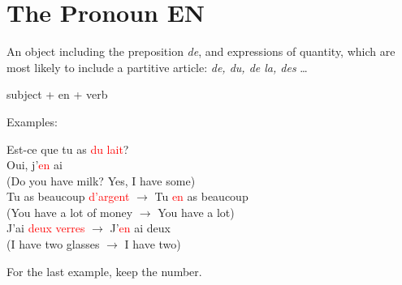 \documentclass{book}
\begin{document}
    \section{The Pronoun EN}
        An object including the preposition \textit{de}, and expressions of quantity, which are most likely to include a partitive article: \textit{de, du, de la, des} \dots
        \begin{center}
            subject + en + verb
        \end{center}
        Examples:
        \begin{center}
            Est-ce que tu as \textcolor{red}{du lait}? \\
            Oui, j'\textcolor{red}{en} ai \\
            (Do you have milk? Yes, I have some) \\
            Tu as beaucoup \textcolor{red}{d'argent} $\to$ Tu \textcolor{red}{en} as beaucoup \\
            (You have a lot of money $\to$ You have a lot) \\
            J'ai \textcolor{red}{deux verres} $\to$ J'\textcolor{red}{en} ai deux \\
            (I have two glasses $\to$ I have two)
        \end{center}
        For the last example, keep the number.
        
\end{document}
